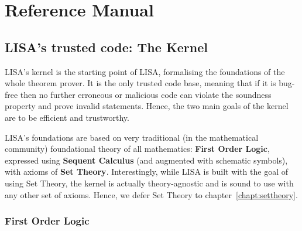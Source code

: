 \newcommand\Var{\operatorname{Var}}
\newcommand\FormulaVar{\operatorname{FormulaVar}}
\newcommand\List{\operatorname{List}}
\newcommand\Lambdaa{\operatorname{Lambda}}
\newcommand\LambdaTT{\operatorname{LambdaTermTerm}}
\newcommand\LambdaTF{\operatorname{LambdaTermFormula}}
\newcommand\LambdaFF{\operatorname{LambdaFormulaFormula}}







\part{Reference Manual}
\label{part:manual}
\chapter{LISA's trusted code: The Kernel}
\label{chapt:kernel}
LISA's kernel is the starting point of LISA, formalising the foundations of the whole theorem prover. It is the only trusted code base, meaning that if it is bug-free then no further erroneous or malicious code can violate the soundness property and prove invalid statements. Hence, the two main goals of the kernel are to be efficient and trustworthy.

LISA's foundations are based on very traditional (in the mathematical community) foundational theory of all mathematics: \textbf{First Order Logic}, expressed using \textbf{Sequent Calculus} (and augmented with schematic symbols), with axioms of \textbf{Set Theory}.
Interestingly, while LISA is built with the goal of using Set Theory, the kernel is actually theory-agnostic and is sound to use with any other set of axioms. Hence, we defer Set Theory to chapter~\ref{chapt:settheory}.

\section{First Order Logic}
\label{sect:FOL}

